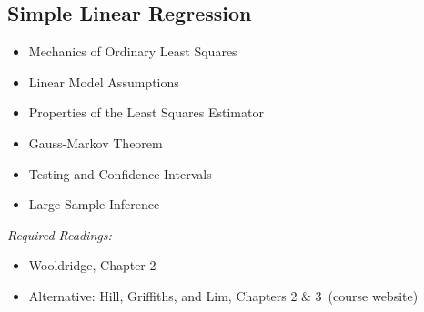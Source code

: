 \documentclass[PS]{syllabus}
\newif\ifrelease
\newcommand{\onsite}{\ifrelease\else\ (course website)\fi}
\begin{document}
\begin{syllabus}



\section{Simple Linear Regression}

\begin{itemize}
\item Mechanics of Ordinary Least Squares
\item Linear Model Assumptions
\item Properties of the Least Squares Estimator
\item Gauss-Markov Theorem
\item Testing and Confidence Intervals
\item Large Sample Inference
\end{itemize}
\textit{Required Readings:} \begin{itemize}
  \item Wooldridge, Chapter 2
  \item Alternative: Hill, Griffiths, and Lim, Chapters 2 \& 3\onsite
\end{itemize}



\end{syllabus}
\end{document}
